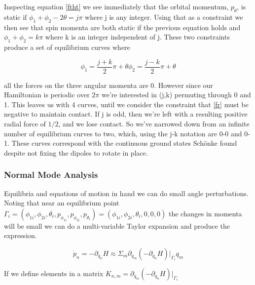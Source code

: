 \documentclass[prbg,preprint]{revtex4-1}
\begin{document}
Inspecting equation \ref{ftht} we see immediately that the orbital momentum, $p_\theta$, is static if $\phi_{1} + \phi_{2} - 2 \theta = j \pi$ where j is any integer. Using that as a constraint we then see that spin momenta are both static if the previous equation holds and $\phi_{1} + \phi_{2} = k\pi$ where k is an integer independent of j. These two constraints produce a set of equilibrium curves where

\begin{subequations}
	\begin{equation}
		\phi_1 = \frac{j+k}{2}\pi +\theta
	\end{equation}
	\begin{equation}
		\phi_2 = \frac{j-k}{2}\pi +\theta
	\end{equation}
\end{subequations}

all the forces on the three angular momenta are 0. However since our Hamiltonian is periodic over $2\pi$ we're interested in (j,k) permuting through 0 and 1. This leaves us with 4 curves, until we consider the constraint that \ref{fr} must be negative to maintain contact. If j is odd, then we're left with a resulting positive radial force of $1/2$, and we lose contact. So we've narrowed down from an infinite number of equilibrium curves to two, which, using the j-k notation are 0-0 and 0-1. These curves correspond with the continuous ground states Schönke \cite{PhysRevApplied.4.064007} found despite not fixing the dipoles to rotate in place.



\subsubsection{Normal Mode Analysis}
Equilibria and equations of motion in hand we can do small angle perturbations. Noting that near an equilibrium point 
$\Gamma_i = 
(
\phi_{1i},\phi_{2i},\theta_{i},
p_{\phi_{1i}},p_{\phi_{2i}},p_{\theta_{i}}
)
=
(\phi_{1i},\phi_{2i},\theta_{i},0,0,0)
$ 
the changes in momenta will be small we can do a multi-variable Taylor expansion and produce the expression.

\begin{equation}\label{taylor_force}
	\dot p_n 
	=
	-\partial_{q_n}H
	\approx 
	\Sigma_m \partial_{q_m}(-\partial_{q_n} H)|_{\Gamma_i} q_m 
\end{equation}

If we define elements in a matrix 
$K_{n,m}= \partial_{q_m}(-\partial_{q_n} H)|_{\Gamma_i}$
\end{document}
